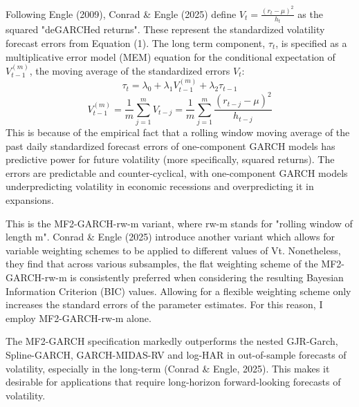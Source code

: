 \documentclass[12pt]{article}
\begin{document}
Following Engle (2009), Conrad \& Engle (2025) define $V_t=\frac{(r_t-\mu)^2}{h_t}$ as the squared "deGARCHed returns". These represent the standardized volatility forecast errors from Equation (1). The long term component, $\tau_t$, is specified as a multiplicative error model (MEM) equation for the conditional expectation of $V_{t-1}^{(m)}$, the moving average of the standardized errors $V_t$:
\begin{equation}
\tau_t=\lambda_0+\lambda_1V_{t-1}^{(m)}+\lambda_2\tau_{t-1}
\end{equation}
\begin{equation}
V_{t-1}^{(m)}=\frac{1}{m}\sum_{j=1}^mV_{t-j}=\frac{1}{m}\sum_{j=1}^m\frac{(r_{t-j}-\mu)^2}{h_{t-j}}
\end{equation}
This is because of the empirical fact that a rolling window moving average of the past daily standardized forecast errors of one-component GARCH models has predictive power for future volatility (more specifically, squared returns). The errors are predictable and counter-cyclical, with one-component GARCH models underpredicting volatility in economic recessions and overpredicting it in expansions. \par
This is the MF2-GARCH-rw-m variant, where rw-m stands for "rolling window of length m". Conrad \& Engle (2025) introduce another variant which allows for variable weighting schemes to be applied to different values of Vt. Nonetheless, they find that across various subsamples, the flat weighting scheme of the MF2-GARCH-rw-m is consistently preferred when considering the resulting Bayesian Information Criterion (BIC) values. Allowing for a flexible weighting scheme only increases the standard errors of the parameter estimates. For this reason, I employ MF2-GARCH-rw-m alone.\par
The MF2-GARCH specification markedly outperforms the nested GJR-Garch, Spline-GARCH, GARCH-MIDAS-RV and log-HAR in out-of-sample forecasts of volatility, especially in the long-term (Conrad \& Engle, 2025). This makes it desirable for applications that require long-horizon forward-looking forecasts of volatility.\par
\end{document}

